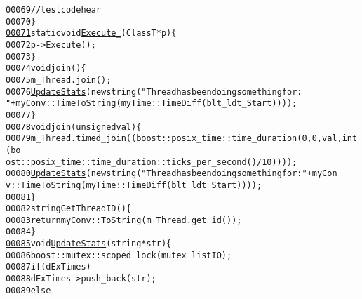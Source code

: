 \begin{footnotesize}
\begin{alltt}
00069             \textcolor{comment}{//test code hear}
00070         \}
\hypertarget{myThreadTemplates_8hpp_source_l00071}{}\hyperlink{classmyThreadTemplates_1_1thread__1_a24e615ac4afa0d376faefd500ed47e43}{00071}         \textcolor{keyword}{static} \textcolor{keywordtype}{void} \hyperlink{classmyThreadTemplates_1_1thread__1_a24e615ac4afa0d376faefd500ed47e43}{Execute_}(ClassT *p)\{
00072             p->Execute();
00073         \}
\hypertarget{myThreadTemplates_8hpp_source_l00074}{}\hyperlink{classmyThreadTemplates_1_1thread__1_ae393ee33ecbfee158a03a4c0f21cf95c}{00074}                 \textcolor{keywordtype}{void} \hyperlink{classmyThreadTemplates_1_1thread__1_ae393ee33ecbfee158a03a4c0f21cf95c}{join}()\{
00075             m\_Thread.join();
00076                     \hyperlink{classmyThreadTemplates_1_1thread__1_a2cd2286a9d51537395123832a6a25ebc}{UpdateStats}(\textcolor{keyword}{new} \textcolor{keywordtype}{string}(\textcolor{stringliteral}{"Thread has been doing something for: 
      "}+ myConv::TimeToString(myTime::TimeDiff(blt\_ldt\_Start))));
00077         \}
\hypertarget{myThreadTemplates_8hpp_source_l00078}{}\hyperlink{classmyThreadTemplates_1_1thread__1_a9a0372afc5bd30783dde8fed70df908c}{00078}                 \textcolor{keywordtype}{void} \hyperlink{classmyThreadTemplates_1_1thread__1_a9a0372afc5bd30783dde8fed70df908c}{join}(\textcolor{keywordtype}{unsigned} val)\{
00079             m\_Thread.timed\_join(( boost::posix\_time::time\_duration(0,0,val,\textcolor{keywordtype}{int}(bo
      ost::posix\_time::time\_duration::ticks\_per\_second() / 10))));
00080             \hyperlink{classmyThreadTemplates_1_1thread__1_a2cd2286a9d51537395123832a6a25ebc}{UpdateStats}(\textcolor{keyword}{new} \textcolor{keywordtype}{string}(\textcolor{stringliteral}{"Thread has been doing something for: "}+ myCon
      v::TimeToString(myTime::TimeDiff(blt\_ldt\_Start))));
00081         \}
00082         \textcolor{keywordtype}{string} GetThreadID()\{
00083             \textcolor{keywordflow}{return} myConv::ToString(m\_Thread.get\_id());
00084         \}
\hypertarget{myThreadTemplates_8hpp_source_l00085}{}\hyperlink{classmyThreadTemplates_1_1thread__1_a2cd2286a9d51537395123832a6a25ebc}{00085}         \textcolor{keywordtype}{void} \hyperlink{classmyThreadTemplates_1_1thread__1_a2cd2286a9d51537395123832a6a25ebc}{UpdateStats}(\textcolor{keywordtype}{string} *str)\{
00086             boost::mutex::scoped\_lock(mutex\_listIO);
00087             \textcolor{keywordflow}{if} (dExTimes)
00088                 dExTimes->push\_back(str);
00089             \textcolor{keywordflow}{else}

\end{alltt}
\end{footnotesize}
